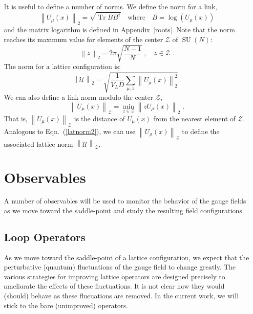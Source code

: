\documentclass[preprint,aps,prd]{revtex4-2}
\newcommand{\be}{\begin{equation}}
\newcommand{\eq}{\end{equation}}
\newcommand{\zentrum}{\mathcal{Z}}       %
\newcommand{\config}{\mathcal{U}}
\DeclareMathOperator{\SU}{SU}
\DeclareMathOperator{\Tr}{Tr}
\begin{document}
It is useful to define a number of norms.  We define the norm
for a link,
%
\be
   \left\lVert U_\mu(x) \right\rVert_2 =
   \sqrt{\Tr B B^\dagger} \quad \mbox{where}
   \quad B = \log\left(U_\mu(x)\right)
   \label{sunorm}
\eq
and the matrix logarithm is defined in Appendix~\ref{roots}.
Note that the norm reaches its maximum value for elements
of the center $\zentrum$ of $\SU(N)$: 
\be
    \left\lVert z \right\rVert_2 = 2\pi \sqrt{\frac{N-1}{N}} \; ,
     \quad z\in \zentrum \; .
\eq
The norm for a lattice configuration is:
\be
   \left\lVert \config \right\rVert_2 =
   \sqrt{\frac{1}{V_L D} \sum_{\mu,x} \left\lVert U_\mu(x) \right\rVert_2^2}
   \; . \label{latnorm2}
\eq
%
%
We can also define a link norm modulo the center $\zentrum$,
\be
\left\lVert U_\mu(x) \right\rVert_\zentrum =
    \min_{z\in \zentrum} \left\lVert z U_\mu(x) \right\rVert_2 \; .
\eq
That is, $\left\lVert U_\mu(x) \right\rVert_\zentrum$ is the distance
of $U_\mu(x)$ from the nearest element of $\zentrum$.
Analogous to Eqn.~(\ref{latnorm2}), we can
use $\left\lVert U_\mu(x) \right\rVert_\zentrum$ to define
the associated lattice norm $\left\lVert \config \right\rVert_\zentrum$,

\section{Observables}

A number of observables will be used to monitor the behavior of the
gauge fields as we move toward the saddle-point and study the
resulting field configurations.

\subsection{Loop Operators}

As we move toward the saddle-point of a lattice configuration,
we expect that the perturbative (quantum) fluctuations of
the gauge field to change greatly.  The various strategies for
improving lattice operators are designed precisely to ameliorate
the effects of these fluctuations.
It is not clear how they would (should) behave as these flucuations
are removed.  In the current work, we will stick to
the bare (unimproved) operators.
\end{document}
